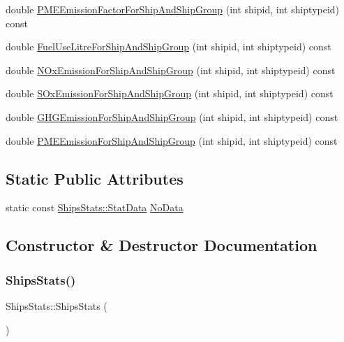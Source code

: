 \begin{DoxyCompactItemize}
\item 
double \mbox{\hyperlink{class_ships_stats_ada68e85ba3dc96bdb30a0cd0a3ebb873}{P\+M\+E\+Emission\+Factor\+For\+Ship\+And\+Ship\+Group}} (int shipid, int shiptypeid) const
\item 
double \mbox{\hyperlink{class_ships_stats_a8c2654cf3174809d0b64e60e9f11b5cc}{Fuel\+Use\+Litre\+For\+Ship\+And\+Ship\+Group}} (int shipid, int shiptypeid) const
\item 
double \mbox{\hyperlink{class_ships_stats_ab4125f36d0cfb5f3910a541359308b02}{N\+Ox\+Emission\+For\+Ship\+And\+Ship\+Group}} (int shipid, int shiptypeid) const
\item 
double \mbox{\hyperlink{class_ships_stats_a976438da1433ee6ccf0e48697e8081be}{S\+Ox\+Emission\+For\+Ship\+And\+Ship\+Group}} (int shipid, int shiptypeid) const
\item 
double \mbox{\hyperlink{class_ships_stats_aa63c88ca2fae2f070101a0225ac6e4ef}{G\+H\+G\+Emission\+For\+Ship\+And\+Ship\+Group}} (int shipid, int shiptypeid) const
\item 
double \mbox{\hyperlink{class_ships_stats_a12dab2c46b88ebe4cd285233c429d8e8}{P\+M\+E\+Emission\+For\+Ship\+And\+Ship\+Group}} (int shipid, int shiptypeid) const
\end{DoxyCompactItemize}
\subsection*{Static Public Attributes}
\begin{DoxyCompactItemize}
\item 
static const \mbox{\hyperlink{struct_ships_stats_1_1_stat_data}{Ships\+Stats\+::\+Stat\+Data}} \mbox{\hyperlink{class_ships_stats_a9976669d2378aeebbb769356fda7018c}{No\+Data}}
\end{DoxyCompactItemize}


\subsection{Constructor \& Destructor Documentation}
\mbox{\label{class_ships_stats_ad0b17a13b5e5972b02292e96f71a2e76}} 
\subsubsection{\texorpdfstring{ShipsStats()}{ShipsStats()}\hspace{0.1cm}{\footnotesize\ttfamily [1/3]}}
{\footnotesize\ttfamily Ships\+Stats\+::\+Ships\+Stats (\begin{DoxyParamCaption}{ }\end{DoxyParamCaption})}

